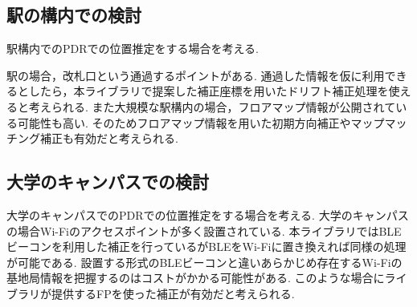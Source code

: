 \subsection{駅の構内での検討}
駅構内でのPDRでの位置推定をする場合を考える.

駅の場合，改札口という通過するポイントがある.
通過した情報を仮に利用できるとしたら，本ライブラリで提案した補正座標を用いたドリフト補正処理を使えると考えられる.
また大規模な駅構内の場合，フロアマップ情報が公開されている可能性も高い.
そのためフロアマップ情報を用いた初期方向補正やマップマッチング補正も有効だと考えられる.


\subsection{大学のキャンパスでの検討}
大学のキャンパスでのPDRでの位置推定をする場合を考える.
大学のキャンパスの場合Wi-Fiのアクセスポイントが多く設置されている.
本ライブラリではBLEビーコンを利用した補正を行っているがBLEをWi-Fiに置き換えれば同様の処理が可能である.
設置する形式のBLEビーコンと違いあらかじめ存在するWi-Fiの基地局情報を把握するのはコストがかかる可能性がある.
このような場合にライブラリが提供するFPを使った補正が有効だと考えられる.
